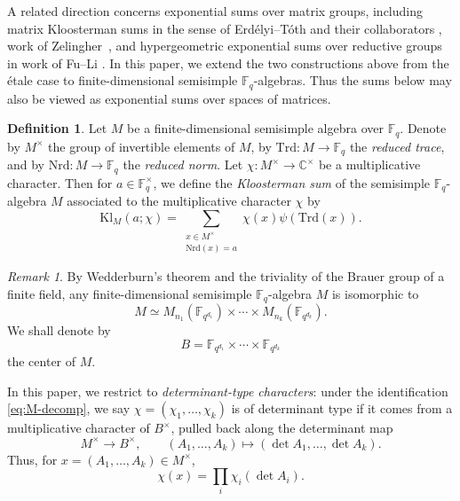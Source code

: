 \documentclass[11pt]{amsart}
\newcommand{\Kl}{\mathrm{Kl}}
\newcommand{\Nrd}{\mathrm{Nrd}}
\newcommand{\Trd}{\mathrm{Trd}}
\numberwithin{equation}{section}
\theoremstyle{remark}
\newtheorem{remark}[equation]{Remark}
\theoremstyle{plain}
\theoremstyle{definition}
\newtheorem{definition}[equation]{Definition}
\begin{document}
A related direction concerns exponential sums over matrix groups, including
matrix Kloosterman sums in the sense of
Erdélyi--Tóth and their collaborators
\cite{erdelyi-toth_matrix-kloosterman,
  erdelyi-sawin-toth_purity-locus,
  erdelyi-toth-zabradi_matrix-prime-powers}, work of
Zelingher~\cite{zelingher_matrix-kloosterman-hall-littlewood}, and
hypergeometric exponential sums over reductive groups in work of
Fu--Li \cite{fu-li_hypergeometric-reductive-groups}.  In this paper,
we extend the two constructions above from the étale case to
finite-dimensional semisimple \(\mathbb{F}_q\)-algebras.  Thus the sums
below may also be viewed as exponential sums over spaces of matrices.

\begin{definition}
Let \(M\) be a finite-dimensional semisimple algebra over
\(\mathbb{F}_q\).  Denote by \(M^{\times}\) the group of invertible
elements of \(M\), by \(\Trd\colon M \to \mathbb{F}_q\) the
\emph{reduced trace}, and by \(\Nrd\colon M \to \mathbb{F}_q\)
the \emph{reduced norm}.  Let
\(\chi\colon M^{\times} \to \mathbb{C}^{\times}\) be a multiplicative
character.  Then for \(a\in\mathbb{F}_q^\times\), we define the
\emph{Kloosterman sum} of the semisimple \(\mathbb{F}_q\)-algebra
\(M\) associated to the multiplicative character \(\chi\) by
\begin{equation*}
\Kl_M(a;\chi)
=
\sum_{\substack{x\in M^\times\\ \Nrd(x)=a}}
\chi(x)\psi(\Trd(x)).
\end{equation*}
\end{definition}

\begin{remark}
By Wedderburn's theorem and the triviality of the Brauer group of a
finite field, any finite-dimensional semisimple
\(\mathbb{F}_q\)-algebra \(M\) is isomorphic to
\begin{equation}\label{eq:M-decomp}
M\simeq
M_{n_1}(\mathbb{F}_{q^{d_1}})
\times\cdots\times
M_{n_k}(\mathbb{F}_{q^{d_k}}).
\end{equation}
We shall denote by
\[
B=\mathbb{F}_{q^{d_1}}\times\cdots\times\mathbb{F}_{q^{d_k}}
\]
the center of \(M\).
\end{remark}


In this paper, we restrict to \emph{determinant-type characters}:
under the identification \eqref{eq:M-decomp}, we say
\(\chi=(\chi_1,\ldots,\chi_k)\) is of determinant type if it comes
from a multiplicative character of \(B^{\times}\), pulled back along
the determinant map
\[
M^\times\longrightarrow B^\times,\qquad
(A_1,\ldots,A_k)\longmapsto (\det A_1,\ldots,\det A_k).
\]
Thus, for
\(x=(A_1,\ldots,A_k)\in M^\times\),
\[
\chi(x)=\prod_i \chi_i(\det A_i).
\]
\end{document}
